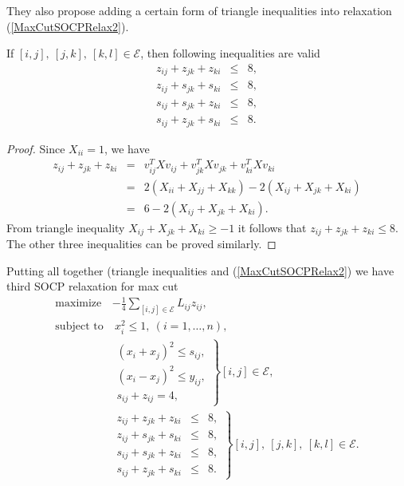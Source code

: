 \documentclass[12pt]{book}
\theoremstyle{definition}
\begin{document}
They also propose adding a certain form of triangle inequalities into relaxation (\ref{MaxCutSOCPRelax2}). 

\prop \label{MuramatsuTriangleIneq}
If $[i,j],\ [j,k],\ [k,l]\in\mathcal{E}$, then following inequalities are valid \rm
\begin{eqnarray*}
z_{ij} + z_{jk} + z_{ki} &\leq & 8, \\
z_{ij} + s_{jk} + s_{ki} &\leq & 8, \\
s_{ij} + s_{jk} + z_{ki} &\leq & 8, \\
s_{ij} + z_{jk} + s_{ki} &\leq & 8.
\end{eqnarray*}

\begin{proof}
Since $X_{ii} = 1 $, we have 
\begin{eqnarray*}
z_{ij} + z_{jk} + z_{ki} &=& v_{ij}^TXv_{ij} + v_{jk}^TXv_{jk} + v_{ki}^TXv_{ki} \\
 & = & 2(X_{ii} + X_{jj} + X_{kk}) - 2(X_{ij} + X_{jk} + X_{ki}) \\
 & = & 6 - 2(X_{ij} + X_{jk} + X_{ki}).
\end{eqnarray*}
From triangle inequality $X_{ij} + X_{jk} + X_{ki}\geq -1$ it follows that $z_{ij} + z_{jk} + z_{ki} \leq 8.$ The other three inequalities can be proved similarly.
\end{proof}

Putting all together (triangle inequalities and (\ref{MaxCutSOCPRelax2}) we have third SOCP relaxation for max cut
\begin{equation}
\begin{array}{ll}
\label{MaxCutSOCPRelax2+TriangleIneq}
\mbox{maximize} & - \frac{1}{4}\sum_{[i,j]\in \mathcal{E}} L_{ij}z_{ij}, \\
\mbox{subject to} & \ x_i^2\leq 1 , \ (i = 1,\dots ,n),\\
&  \left.\begin{array}{lcl}
	(x_i + x_j)^2 \leq s_{ij},  \\
 	(x_i - x_j)^2 \leq y_{ij},  \\
 	s_{ij} + z_{ij} = 4,  
 \end{array}\right\rbrace [i,j] \in\mathcal{E},\\
& \left.\begin{array}{lcl}
	z_{ij} + z_{jk} + z_{ki} &\leq & 8, \\
	z_{ij} + s_{jk} + s_{ki} &\leq & 8, \\
	s_{ij} + s_{jk} + z_{ki} &\leq & 8, \\
	s_{ij} + z_{jk} + s_{ki} &\leq & 8.
\end{array}\right\rbrace [i,j],\ [j,k],\ [k,l]\in\mathcal{E}.
\end{array}
\end{equation}
\end{document}
